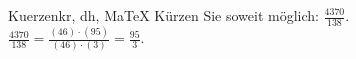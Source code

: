 \begin{MAufgabe}{Kuerzen}{kr, dh, MaTeX}
K\"urzen Sie soweit m\"oglich: $\frac{4370}{138}$.\\ 
\ifLsg\MLoesung
\quad $\frac{4370}{138}=\frac{(46)\cdot(95)}{(46)\cdot(3)}=\frac{95}{3}$.\else\relax\fi
 \end{MAufgabe}